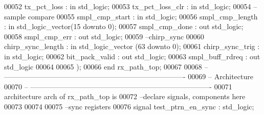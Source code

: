 \begin{DoxyCode}
00052       \textcolor{vhdlchar}{tx_pct_loss}          \textcolor{vhdlchar}{:} \textcolor{keywordflow}{in} \textcolor{comment}{std\_logic};
00053       \textcolor{vhdlchar}{tx_pct_loss_clr}      \textcolor{vhdlchar}{:} \textcolor{keywordflow}{in} \textcolor{comment}{std\_logic};
00054 \textcolor{keyword}{      --sample compare}
00055       \textcolor{vhdlchar}{smpl_cmp_start}       \textcolor{vhdlchar}{:} \textcolor{keywordflow}{in} \textcolor{comment}{std\_logic};
00056       \textcolor{vhdlchar}{smpl_cmp_length}      \textcolor{vhdlchar}{:} \textcolor{keywordflow}{in} \textcolor{comment}{std\_logic\_vector}\textcolor{vhdlchar}{(}\textcolor{vhdllogic}{}\textcolor{vhdllogic}{15} \textcolor{keywordflow}{downto} \textcolor{vhdllogic}{}\textcolor{vhdllogic}{0}\textcolor{vhdlchar}{)};
00057       \textcolor{vhdlchar}{smpl_cmp_done}        \textcolor{vhdlchar}{:} \textcolor{keywordflow}{out} \textcolor{comment}{std\_logic};
00058       \textcolor{vhdlchar}{smpl_cmp_err}         \textcolor{vhdlchar}{:} \textcolor{keywordflow}{out} \textcolor{comment}{std\_logic};
00059 \textcolor{keyword}{        --chirp\_sync}
00060         \textcolor{vhdlchar}{chirp_sync_length}       \textcolor{vhdlchar}{:} \textcolor{keywordflow}{in} \textcolor{comment}{std\_logic\_vector} \textcolor{vhdlchar}{(}\textcolor{vhdllogic}{}\textcolor{vhdllogic}{63} \textcolor{keywordflow}{downto} \textcolor{vhdllogic}{}\textcolor{vhdllogic}{0}\textcolor{vhdlchar}{)};
00061         \textcolor{vhdlchar}{chirp_sync_trig}     \textcolor{vhdlchar}{:} \textcolor{keywordflow}{in} \textcolor{comment}{std\_logic};
00062         \textcolor{vhdlchar}{bit_pack_valid}          \textcolor{vhdlchar}{:} \textcolor{keywordflow}{out} \textcolor{comment}{std\_logic};
00063         \textcolor{vhdlchar}{smpl_buff_rdreq}     \textcolor{vhdlchar}{:} \textcolor{keywordflow}{out} \textcolor{comment}{std\_logic}
00064         
00065         \textcolor{vhdlchar}{)};
00066 \textcolor{keywordflow}{end} \textcolor{vhdlchar}{rx\_path\_top};
00067 
00068 \textcolor{keyword}{-- ----------------------------------------------------------------------------}
00069 \textcolor{keyword}{-- Architecture}
00070 \textcolor{keyword}{-- ----------------------------------------------------------------------------}
00071 \textcolor{keywordflow}{architecture} arch \textcolor{keywordflow}{of} rx_path_top is
00072 \textcolor{keyword}{--declare signals,  components here}
00073 
00074 
00075 \textcolor{keyword}{--sync registers}
00076 \textcolor{keywordflow}{signal} \textcolor{vhdlchar}{test_ptrn_en_sync}      \textcolor{vhdlchar}{:} \textcolor{comment}{std\_logic};

\end{DoxyCode}
